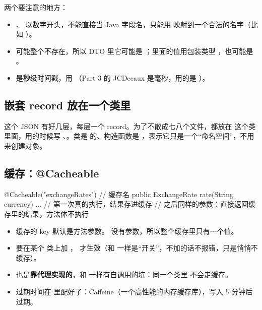 两个要注意的地方：
\begin{itemize}
  \item {}、 以数字开头，不能直接当 Java 字段名，只能用  映射到一个合法的名字（比如 ）。
  \item {} 可能整个不存在，所以 DTO 里它可能是 ；里面的值用包装类型 ，也可能是 。
  \item {} 是\textbf{秒}级时间戳，用 （Part 3 的 JCDecaux 是毫秒，用的是 ）。
\end{itemize}

\subsection{嵌套 record 放在一个类里}

这个 JSON 有好几层，每层一个 record。为了不散成七八个文件，都放在  这个类里面，用的时候写 、。类是  的、构造函数是 ，表示它只是一个“命名空间”，不用来创建对象。

\subsection{缓存：@Cacheable}

\begin{java}
@Cacheable("exchangeRates")                        // 缓存名
public ExchangeRate rate(String currency) { ... }  // 第一次真的执行，结果存进缓存
                                                   // 之后同样的参数：直接返回缓存里的结果，方法体不执行
\end{java}

\begin{itemize}
  \item 缓存的 key 默认是方法参数。 没有参数，所以整个缓存里只有一个值。
  \item 要在某个  类上加 ， 才生效（和  一样是“开关”，不加的话不报错，只是悄悄不缓存）。
  \item {} 也是\textbf{靠代理实现的}，和  一样有自调用的坑：同一个类里  不会走缓存。
  \item 过期时间在  里配好了：Caffeine（一个高性能的内存缓存库），写入 5 分钟后过期。
\end{itemize}

